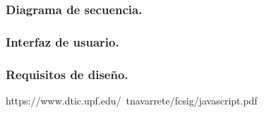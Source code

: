 \documentclass[12pt, a4paper, titlepage]{article}
\begin{document}
			\subsubsection{Diagrama de secuencia.}
			\subsubsection{Interfaz de usuario.}
			\subsubsection{Requisitos de diseño.}
	\begin{thebibliography}{20}
		 https://www.dtic.upf.edu/~tnavarrete/fcsig/javascript.pdf \\
		
		
	\end{thebibliography}		
\end{document}
